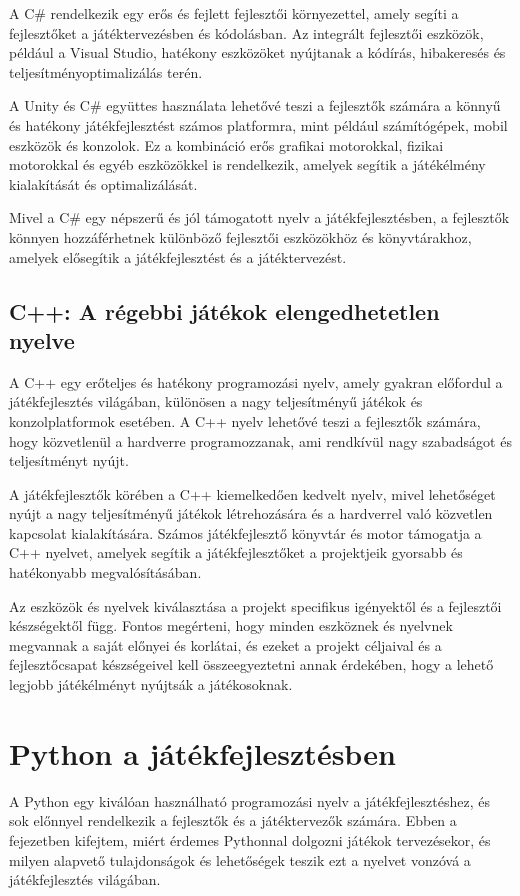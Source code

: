 A C\# rendelkezik egy erős és fejlett fejlesztői környezettel, amely segíti a fejlesztőket a játéktervezésben és kódolásban. Az integrált fejlesztői eszközök, például a Visual Studio, hatékony eszközöket nyújtanak a kódírás, hibakeresés és teljesítményoptimalizálás terén.

A Unity és C\# együttes használata lehetővé teszi a fejlesztők számára a könnyű és hatékony játékfejlesztést számos platformra, mint például számítógépek, mobil eszközök és konzolok. Ez a kombináció erős grafikai motorokkal, fizikai motorokkal és egyéb eszközökkel is rendelkezik, amelyek segítik a játékélmény kialakítását és optimalizálását.

Mivel a C\# egy népszerű és jól támogatott nyelv a játékfejlesztésben, a fejlesztők könnyen hozzáférhetnek különböző fejlesztői eszközökhöz és könyvtárakhoz, amelyek elősegítik a játékfejlesztést és a játéktervezést.
\subsection{C++: A régebbi játékok elengedhetetlen nyelve}\cite{cpp-doc}

\indent \indent A C++ egy erőteljes és hatékony programozási nyelv, amely gyakran előfordul a játékfejlesztés világában, különösen a nagy teljesítményű játékok és konzolplatformok esetében. A C++ nyelv lehetővé teszi a fejlesztők számára, hogy közvetlenül a hardverre programozzanak, ami rendkívül nagy szabadságot és teljesítményt nyújt.

A játékfejlesztők körében a C++ kiemelkedően kedvelt nyelv, mivel lehetőséget nyújt a nagy teljesítményű játékok létrehozására és a hardverrel való közvetlen kapcsolat kialakítására. Számos játékfejlesztő könyvtár és motor támogatja a C++ nyelvet, amelyek segítik a játékfejlesztőket a projektjeik gyorsabb és hatékonyabb megvalósításában.

Az eszközök és nyelvek kiválasztása a projekt specifikus igényektől és a fejlesztői készségektől függ. Fontos megérteni, hogy minden eszköznek és nyelvnek megvannak a saját előnyei és korlátai, és ezeket a projekt céljaival és a fejlesztőcsapat készségeivel kell összeegyeztetni annak érdekében, hogy a lehető legjobb játékélményt nyújtsák a játékosoknak.


\section{Python a játékfejlesztésben}

\indent \indent A Python egy kiválóan használható programozási nyelv a játékfejlesztéshez, és sok előnnyel rendelkezik a fejlesztők és a játéktervezők számára. Ebben a fejezetben kifejtem, miért érdemes Pythonnal dolgozni játékok tervezésekor, és milyen alapvető tulajdonságok és lehetőségek teszik ezt a nyelvet vonzóvá a játékfejlesztés világában.


